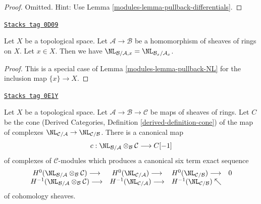 \begin{proof}

Omitted. Hint: Use Lemma \ref{modules-lemma-pullback-differentials}.
\end{proof}

\begin{lemma}[Stalk NL]
\label{modules-lemma-stalk-NL}
\href{https://stacks.math.columbia.edu/tag/0D09}{\texttt{Stacks tag 0D09}}

Let $X$ be a topological space. Let $\mathcal{A} \to \mathcal{B}$
be a homomorphism of sheaves of rings on $X$. Let $x \in X$.
Then we have $\NL_{\mathcal{B}/\mathcal{A}, x} =
\NL_{\mathcal{B}_x/\mathcal{A}_x}$.
\end{lemma}

\begin{proof}

This is a special case of Lemma \ref{modules-lemma-pullback-NL}
for the inclusion map $\{x\} \to X$.
\end{proof}

\begin{lemma}
\label{modules-lemma-exact-sequence-NL}
\href{https://stacks.math.columbia.edu/tag/0E1Y}{\texttt{Stacks tag 0E1Y}}

Let $X$ be a topological space. Let
$\mathcal{A} \to \mathcal{B} \to \mathcal{C}$
be maps of sheaves of rings. Let $C$ be the cone
(Derived Categories, Definition \ref{derived-definition-cone})
of the map of complexes
$\NL_{\mathcal{C}/\mathcal{A}} \to \NL_{\mathcal{C}/\mathcal{B}}$.
There is a canonical map
$$
c :
\NL_{\mathcal{B}/\mathcal{A}} \otimes_\mathcal{B} \mathcal{C}
\longrightarrow
C[-1]
$$
of complexes of $\mathcal{C}$-modules
which produces a canonical six term exact sequence
$$
\begin{array}{cccc}H^0(\NL_{\mathcal{B}/\mathcal{A}} \otimes_\mathcal{B} \mathcal{C}) \longrightarrow & H^0(\NL_{\mathcal{C}/\mathcal{A}}) \longrightarrow & H^0(\NL_{\mathcal{C}/\mathcal{B}}) \longrightarrow & 0 \\ H^{-1}(\NL_{\mathcal{B}/\mathcal{A}} \otimes_\mathcal{B} \mathcal{C}) \longrightarrow & H^{-1}(\NL_{\mathcal{C}/\mathcal{A}}) \longrightarrow & H^{-1}(\NL_{\mathcal{C}/\mathcal{B}}) \nwarrow & \end{array}
$$
of cohomology sheaves.
\end{lemma}

